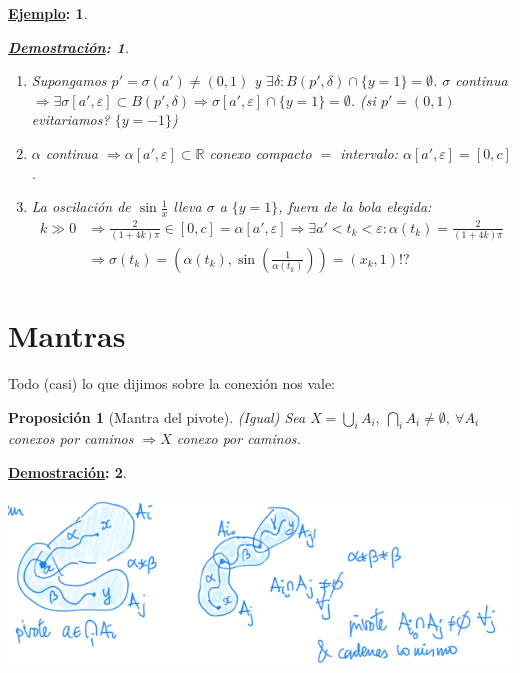 \documentclass[10pt,a4paper,openright]{book}
\theoremstyle{break}
\newtheorem*{prop}{Proposición}
\newtheorem*{demo}{\underline{Demostración}:}
\newtheorem*{ej}{\underline{Ejemplo}:}
\begin{document}
\begin{ej}
\begin{enumerate}
\begin{demo}
\begin{enumerate}
            \item Supongamos $p' = \sigma\left( a' \right) \neq \left( 0, 1 \right)$ y $\exists \delta: B\left( p', \delta \right) \cap \{y = 1\} = \emptyset$. $\sigma$ continua $\Rightarrow \exists \sigma\left[ a', \varepsilon \right] \subset B\left( p', \delta \right) \Rightarrow \sigma\left[ a', \varepsilon \right] \cap \{y = 1\} = \emptyset$. (si $p' = \left( 0, 1 \right)$ evitariamos? $\{y = -1\}$)

            \item $\alpha$ continua $\Rightarrow \alpha\left[ a', \varepsilon \right] \subset \mathbb{R}$ conexo compacto $=$ intervalo: $\alpha\left[ a', \varepsilon \right] = \left[ 0, c \right]$.

            \item La oscilación de $\sin \frac{1}{x}$ lleva $\sigma$ a $\{y = 1\}$, fuera de la bola elegida:
            \begin{align*}
            k \gg 0 &\Rightarrow \frac{2}{\left( 1 + 4k \right) \pi} \in \left[ 0, c \right] = \alpha\left[ a', \varepsilon \right] \Rightarrow \exists a' < t_k < \varepsilon: \alpha\left( t_k \right) = \frac{2}{\left( 1 + 4k \right) \pi}\\ 
                &\Rightarrow \sigma\left( t_k \right) = \left( \alpha\left( t_k \right), \sin\left( \frac{1}{\alpha\left( t_k \right)} \right) \right) = \left( x_k, 1 \right) 
            !?\end{align*}
        \end{enumerate}
    \end{demo}
\end{enumerate}
\end{ej}

\section{Mantras}%
\label{sec:mantras_conx_caminos}
Todo (casi) lo que dijimos sobre la conexión nos vale:
\begin{prop}[Mantra del pivote]
    (Igual) Sea $X = \bigcup_{i} A_i,\ \bigcap_{i} A_i \neq \emptyset,\ \forall A_i$ conexos por caminos $\Rightarrow X$ conexo por caminos. 
\end{prop}
\begin{demo}
\begin{center}
    \includegraphics[scale=0.3]{images/dem_pivote_caminos} 
\end{center}
\end{demo}
\end{document}
